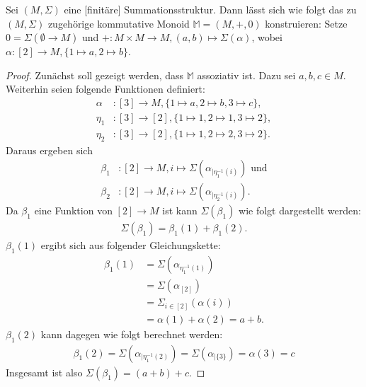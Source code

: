 \documentclass{article}
\begin{document}
\begin{theorem}\label{Theorem_SummationMonoid}
  Sei $(M, \Sigma)$ eine [finitäre] Summationsstruktur.
  Dann lässt sich wie folgt das zu $(M, \Sigma)$ zugehörige kommutative Monoid $\mathbb{M} = (M, +, 0)$ konstruieren:
  Setze $0 = \Sigma(\emptyset \to M)$ und
  $+ \colon M \times M \to M, (a, b) \mapsto \Sigma(\alpha)$, wobei
  $\alpha \colon [2] \to M, \{ 1 \mapsto a, 2 \mapsto b\}$.
\end{theorem}
\begin{proof}
  Zunächst soll gezeigt werden, dass $\mathbb{M}$ assoziativ ist.
  Dazu sei $a,b,c \in M$. Weiterhin seien folgende Funktionen definiert:
  \begin{align*}
    \alpha &\colon [3] \to M, \{ 1 \mapsto a, 2 \mapsto b, 3 \mapsto c \},\\
    \eta_1 &\colon [3] \to [2], \{ 1 \mapsto 1, 2 \mapsto 1, 3 \mapsto 2 \},\\
    \eta_2 &\colon [3] \to [2], \{ 1 \mapsto 1, 2 \mapsto 2, 3 \mapsto 2 \}.
  \end{align*}
  Daraus ergeben sich 
  \begin{align*}
    \beta_1 &\colon [2] \to M, i \mapsto \Sigma(\alpha_{\mid \eta_1^{-1}(i)}) \text{ und}\\
    \beta_2 &\colon [2] \to M, i \mapsto \Sigma(\alpha_{\mid \eta_2^{-1}(i)}).
  \end{align*}
  Da $\beta_1$ eine Funktion von $[2] \to M$ ist kann $\Sigma(\beta_1)$ wie folgt dargestellt werden:
  \begin{align*}
    \Sigma(\beta_1) = \beta_1(1) + \beta_1(2).
  \end{align*}
  $\beta_1(1)$ ergibt sich aus folgender Gleichungskette:
  \begin{align*}
    \beta_1(1) &= \Sigma(\alpha_{\eta_1^{-1}(1)})\\
    &= \Sigma(\alpha_{[2]})\\
    &= \Sigma_{i \in [2]}(\alpha(i))\\ 
    &= \alpha(1) + \alpha(2) = a + b.
  \end{align*}
  $\beta_1(2)$ kann dagegen wie folgt berechnet werden:
  \begin{align*}
    \beta_1(2) = \Sigma(\alpha_{\mid \eta_1^{-1}(2)})
    = \Sigma(\alpha_{\mid \{3\}})
    = \alpha(3) = c
  \end{align*}
  Insgesamt ist also $\Sigma(\beta_1) = (a + b) + c$.
  

\end{proof}
\end{document}
